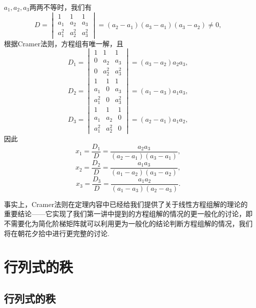 \begin{solution}
    $a_1,a_2,a_3$两两不等时，我们有
    \[D=\begin{vmatrix}
            1      & 1      & 1      \\
            a_1    & a_2    & a_3    \\
            a_1^2  & a_2^2  & a_3^2
        \end{vmatrix}=(a_2-a_1)(a_3-a_1)(a_3-a_2)\neq 0,\]
    根据Cramer法则，方程组有唯一解，且
    \[D_1=\begin{vmatrix}
            1      & 1      & 1      \\
            0      & a_2    & a_3    \\
            0      & a_2^2  & a_3^2
        \end{vmatrix}=(a_3-a_2)a_2a_3,\]
    \[D_2=\begin{vmatrix}
            1      & 1      & 1      \\
            a_1    & 0      & a_3    \\
            a_1^2  & 0      & a_3^2
        \end{vmatrix}=(a_1-a_3)a_1a_3,\]
    \[D_3=\begin{vmatrix}
            1      & 1      & 1      \\
            a_1    & a_2    & 0      \\
            a_1^2  & a_2^2  & 0
        \end{vmatrix}=(a_2-a_1)a_1a_2,\]
    因此
    \[x_1=\dfrac{D_1}{D}=\dfrac{a_2a_3}{(a_2-a_1)(a_3-a_1)},\]\[x_2=\dfrac{D_2}{D}=\dfrac{a_1a_3}{(a_1-a_2)(a_3-a_2)},\]\[x_3=\dfrac{D_3}{D}=\dfrac{a_1a_2}{(a_1-a_3)(a_2-a_3)}.\]
\end{solution}

事实上，Cramer法则在定理内容中已经给我们提供了关于线性方程组解的理论的重要结论——它实现了我们第一讲中提到的方程组解的情况的更一般化的讨论，即不需要化为简化阶梯矩阵就可以利用更为一般化的结论判断方程组解的情况，我们将在朝花夕拾中进行更完整的讨论.

\section{行列式的秩}

\subsection{行列式的秩}

